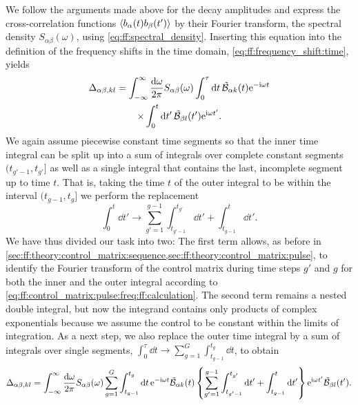 We follow the arguments made above for the decay amplitudes and express the cross-correlation functions $\ev{b_\alpha(t) b_\beta(t')}$ by their Fourier transform, the spectral density $S_{\alpha\beta}(\omega)$, using \cref{eq:ff:spectral_density}.
Inserting this equation into the definition of the frequency shifts in the time domain, \cref{eq:ff:frequency_shift:time}, yields
\begin{multline}\label{eq:ff:frequency_shifts:time}
    \Delta_{\alpha\beta,kl} = \int_{-\infty}^\infty\frac{\dd{\omega}}{2\pi} S_{\alpha\beta}(\omega)
                                   \int_0^\tau\dd{t}\tilde{\mathcal{B}}_{\alpha k}(t)\mathrm{e}^{-\mathrm{i}\omega t} \\
                                   \times\int_0^t\dd{t'}\tilde{\mathcal{B}}_{\beta l}(t')\mathrm{e}^{\mathrm{i}\omega t'}.
\end{multline}
We again assume piecewise constant time segments so that the inner time integral can be split up into a sum of integrals over complete constant segments $(t_{g'-1},t_{g'}]$ as well as a single integral that contains the last, incomplete segment up to time $t$.
That is, taking the time $t$ of the outer integral to be within the interval $(t_{g-1}, t_g]$ we perform the replacement
\begin{equation}
    \int_0^t\dd{t'} \rightarrow \sum_{g'=1}^{g-1}\int_{t_{g'-1}}^{t_{g'}}\dd{t'} + \int_{t_{g-1}}^{t}\dd{t'}.
\end{equation}
We have thus divided our task into two: The first term allows, as before in \cref{sec:ff:theory:control_matrix:sequence,sec:ff:theory:control_matrix:pulse}, to identify the Fourier transform of the control matrix during time steps $g'$ and $g$ for both the inner and the outer integral according to \cref{eq:ff:control_matrix:pulse:freq:ff:calculation}.
The second term remains a nested double integral, but now the integrand contains only products of complex exponentials because we assume the control to be constant within the limits of integration.
As a next step, we also replace the outer time integral by a sum of integrals over single segments, $\int_0^\tau\dd{t}\rightarrow\sum_{g=1}^G\int_{t_{g-1}}^{t_g}\dd{t}$, to obtain
\begin{equation}\label{eq:ff:frequency_shifts:time:substituted}
    \Delta_{\alpha\beta,kl} = \int_{-\infty}^\infty\frac{\dd{\omega}}{2\pi} S_{\alpha\beta}(\omega)
            \sum_{g=1}^{G}\int_{t_{g-1}}^{t_{g}}\dd{t}\mathrm{e}^{-\mathrm{i}\omega t}\tilde{\mathcal{B}}_{\alpha k}(t)
            \left\lbrace\sum_{g'=1}^{g-1}\int_{t_{g'-1}}^{t_{g'}}\dd{t'} + \int_{t_{g-1}}^{t}\dd{t'}\right\rbrace
            \mathrm{e}^{\mathrm{i}\omega t'}\tilde{\mathcal{B}}_{\beta l}(t').
\end{equation}
